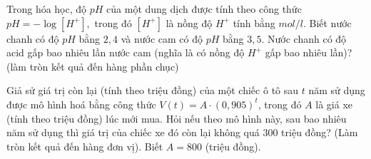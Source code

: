 \begin{bt}%
Trong hóa học, độ $ pH$ của một dung dịch được tính theo công thức $ pH=-\log\left[H^+\right],$ trong đó $\left[H^+\right]$ là nồng độ $H^+$ tính bằng $ mol/l$. Biết nước chanh có độ $ pH$ bằng $ 2{,}4$ và nước cam có độ $ pH$ bằng $ 3{,}5$. Nước chanh có độ acid gấp bao nhiêu lần nước cam (nghĩa là có nồng độ $H^+$ gấp bao nhiêu lần)? (làm tròn kết quả đến hàng phần chục)
\end{bt}

\begin{bt}%
Giả sử giá trị còn lại (tính theo triệu đồng) của một chiếc ô tô sau $t$ năm sử dụng được mô hình hoá bằng công thức $V(t)=A \cdot (0{,}905)^t$, trong đó $A$ là giá xe (tính theo triệu đồng) lúc mới mua. Hỏi nếu theo mô hình này, sau bao nhiêu năm sử dụng thì giá trị của chiếc xe đó còn lại không quá $300$ triệu đồng? (Làm tròn kết quả đến hàng đơn vị). Biết $A=800$ (triệu đồng).
\end{bt}

